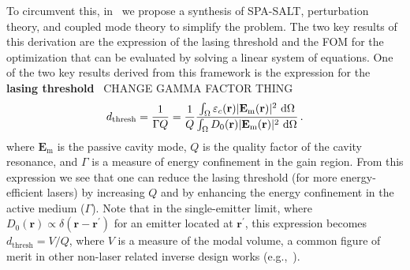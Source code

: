To circumvent this, in~\cite{ownpub4} we propose a synthesis of SPA-SALT, perturbation theory, and coupled mode theory to simplify the problem. 
The two key results of this derivation are the expression of the lasing threshold and the FOM for the optimization that can be evaluated by solving a linear system of equations.
One of the two key results derived from this framework is the expression for the \textbf{lasing threshold}~\cite{ownpub4} CHANGE GAMMA FACTOR THING
\begin{equation}\label{eq:pump_thresh}
    d_\text{thresh} = \frac{1}{\Gamma Q} = \frac{1}{Q} \frac{\int_{\Omega} \varepsilon_c(\mathbf{r})|\mathbf{E}_{\text{m}}(\mathbf{r})|^2\,  \mathop{}\!\text{d} \Omega}{\int_{\Omega} D_0(\mathbf{r}) |\mathbf{E}_{\text{m}}(\mathbf{r})|^2\,  \mathop{}\!\text{d} \Omega}\,.
\end{equation}
where $\mathbf{E}_\text{m}$ is the passive cavity mode, $Q$ is the quality factor of the cavity resonance, and $\Gamma$ is a measure 
of energy confinement in the gain region. From this expression we see that one can reduce the lasing threshold (for more energy-efficient lasers) by increasing $Q$ and by enhancing the energy confinement in the
active medium ($\Gamma$). Note that in the single-emitter limit, where $D_0(\mathbf{r})\propto \delta (\mathbf{r}-\mathbf{r^\prime})$ for an emitter located at $\mathbf{r}^\prime$, this expression becomes $d_\text{thresh}=V/Q$, where $V$ is a measure
of the modal volume, a common figure of merit in other non-laser related inverse design works (e.g.,~\cite{LDOS_opt_wang}).

